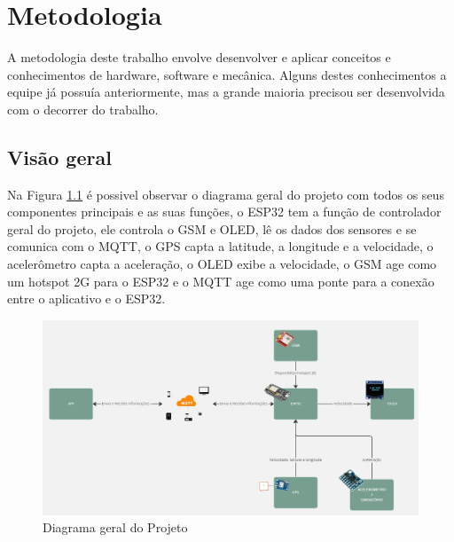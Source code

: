 \chapter{Metodologia}
A metodologia deste trabalho envolve desenvolver e aplicar conceitos e conhecimentos de hardware, software e mecânica. Alguns destes conhecimentos a equipe já possuía anteriormente, mas a grande maioria precisou ser desenvolvida com o decorrer do trabalho.
\section{Visão geral}
Na Figura \ref{fig:diagrama_hardware} é possivel observar o diagrama geral do projeto com todos os seus componentes principais e as suas funções, o ESP32 tem a função de controlador geral do projeto, ele controla o GSM e OLED, lê os dados dos sensores e se comunica com o MQTT, o GPS capta a latitude, a longitude e a velocidade, o acelerômetro capta a aceleração, o OLED exibe a velocidade, o GSM age como um hotspot 2G para o ESP32 e o MQTT age como uma ponte para a conexão entre o aplicativo e o ESP32.

\begin{figure}[!h]
\centering
\includegraphics[width=15cm]{capitulos/Figuras/Diagrama_Hardware.png}
\caption{Diagrama geral do Projeto}
\label{fig:diagrama_hardware}
\end{figure} 

